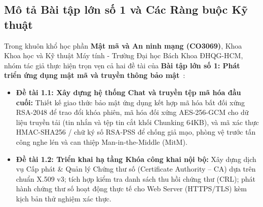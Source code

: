 \documentclass[a4paper,12pt]{article}
\begin{document}
\subsection{Mô tả Bài tập lớn số 1 và Các Ràng buộc Kỹ thuật}
Trong khuôn khổ học phần \textbf{Mật mã và An ninh mạng (CO3069)}, Khoa Khoa học và Kỹ thuật Máy tính - Trường Đại học Bách Khoa ĐHQG-HCM, nhóm tác giả thực hiện trọn vẹn cả hai đề tài của \textbf{Bài tập lớn số 1: Phát triển ứng dụng mật mã và truyền thông bảo mật}~\cite{doc_btl}:
\begin{itemize}
    \item \textbf{Đề tài 1.1: Xây dựng hệ thống Chat và truyền tệp mã hóa đầu cuối:} Thiết kế giao thức bảo mật ứng dụng kết hợp mã hóa bất đối xứng RSA-2048 để trao đổi khóa phiên, mã hóa đối xứng AES-256-GCM cho dữ liệu truyền tải (tin nhắn và tệp tin cắt khối Chunking 64KB), và mã xác thực HMAC-SHA256 / chữ ký số RSA-PSS để chống giả mạo, phòng vệ trước tấn công nghe lén và can thiệp Man-in-the-Middle (MitM).
    \item \textbf{Đề tài 1.2: Triển khai hạ tầng Khóa công khai nội bộ:} Xây dựng dịch vụ Cấp phát \& Quản lý Chứng thư số (Certificate Authority -- CA) dựa trên chuẩn X.509 v3; tích hợp kiểm tra danh sách thu hồi chứng thư (CRL); phát hành chứng thư số hoạt động thực tế cho Web Server (HTTPS/TLS) kèm kịch bản thử nghiệm xác thực.
\end{itemize}
\end{document}
